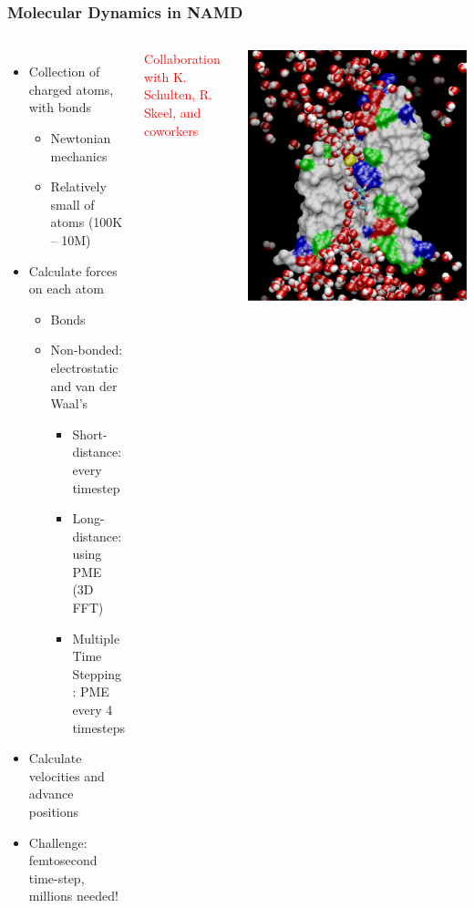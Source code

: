 \begin{frame}[t]
\frametitle{Molecular Dynamics in NAMD}
  \begin{columns}
  \begin{itemize}
    \item Collection of charged atoms, with bonds
    \begin{itemize}
      \item Newtonian mechanics
      \item Relatively small of atoms (100K – 10M)
    \end{itemize}
    \pause
    \item Calculate forces on each atom 
    \begin{itemize}
      \item Bonds
      \item Non-bonded: electrostatic and van der Waal’s
      \begin{itemize}
        \item Short-distance: every timestep
        \item Long-distance: using PME (3D FFT)
        \item Multiple Time Stepping : PME every 4 timesteps 
      \end{itemize}
    \end{itemize}
    \pause
    \item Calculate velocities and advance positions
    \item Challenge: femtosecond time-step, millions needed!
  \end{itemize}
  \pause
  \textcolor{red}{Collaboration with K. Schulten, R. Skeel, and coworkers}
  \vfill
  \begin{center} \includegraphics[width=\textwidth]{figures/namd.pdf} \end{center}

\end{columns}
\end{frame}
